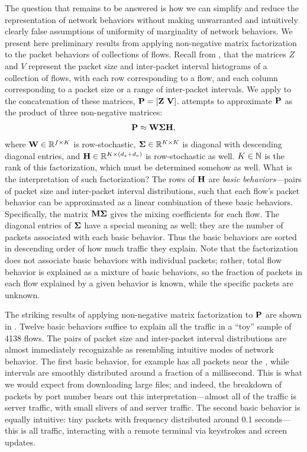 \documentclass[twocolumn,final]{svjour3}
\begin{document}
The question that remains to be answered is how we can simplify and reduce the representation of network behaviors without making unwarranted and intuitively clearly false assumptions of uniformity of marginality of network behaviors. We present here preliminary results from applying non-negative matrix factorization to the packet behaviors of collections of flows. Recall from , that the matrices $Z$ and $V$ represent the packet size and inter-packet interval histograms of a collection of flows, with each row corresponding to a flow, and each column corresponding to a packet size or a range of inter-packet intervals. We apply  to the concatenation of these matrices, $\mathbf{P}=[\mathbf{Z}~\mathbf{V}]$.  attempts to approximate $\mathbf{P}$ as the product of three non-negative matrices:
\begin{align}
\mathbf{P} \approx \mathbf{W}\mathbf{\Sigma}\mathbf{H},
\end{align}
where $\mathbf{W} \in \mathbb{R}^{f \times K}$ is row-stochastic,
$\mathbf{\Sigma} \in \mathbb{R}^{K \times K}$ is diagonal with descending diagonal entries, and
$\mathbf{H} \in \mathbb{R}^{K \times (d_z+d_v)}$ is row-stochastic as well.
$K\in\mathbb{N}$ is the rank of this factorization, which must be determined somehow as well.
What is the interpretation of such factorization?
The rows of $\mathbf{H}$ are \emph{basic behaviors}---pairs of packet size and inter-packet interval distributions, such that each flow's packet behavior can be approximated as a linear combination of these basic behaviors.
Specifically, the matrix $\mathbf{M}\mathbf{\Sigma}$ gives the mixing coefficients for each flow.
The diagonal entries of $\mathbf{\Sigma}$ have a special meaning as well:
they are the number of packets associated with each basic behavior.
Thus the basic behaviors are sorted in descending order of how much traffic they explain.
Note that the factorization does not associate basic behaviors with individual packets;
rather, total flow behavior is explained as a mixture of basic behaviors, so the fraction of packets in each flow explained by a given behavior is known, while the specific packets are unknown.

The striking results of applying non-negative matrix factorization to $\mathbf{P}$ are shown in . Twelve basic behaviors suffice to explain all the traffic in a ``toy''  sample of 4138 flows. The pairs of packet size and inter-packet interval distributions are almost immediately recognizable as resembling intuitive modes of network behavior. The first basic behavior, for example has all packets near the , while intervals are smoothly distributed around a fraction of a millisecond. This is what we would expect from downloading large files; and indeed, the breakdown of packets by port number bears out this interpretation---almost all of the traffic is  server traffic, with small slivers of  and  server traffic. The second basic behavior is equally intuitive: tiny packets with frequency distributed around 0.1 seconds---this is all  traffic, interacting with a remote terminal via keystrokes and screen updates.
\end{document}

